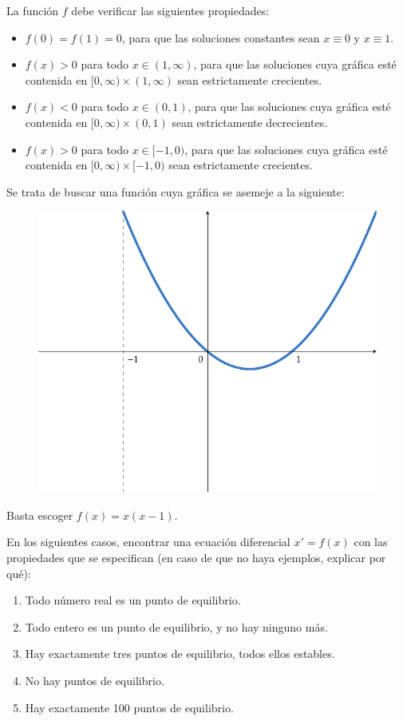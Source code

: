 \documentclass[11pt]{report}
\begin{document}
\begin{solution}
    La función $f$ debe verificar las siguientes propiedades:
    \begin{itemize}
        \item $f(0) = f(1) = 0$, para que las soluciones constantes sean $x \equiv 0$ y $x \equiv 1$.
        \item $f(x) > 0$ para todo $x \in(1,\infty)$, para que las soluciones cuya gráfica esté contenida en $[0,\infty)\times(1,\infty)$ sean estrictamente crecientes.
        \item $f(x) < 0$ para todo $x \in (0,1)$, para que las soluciones cuya gráfica esté  contenida en $[0,\infty)\times(0,1)$ sean estrictamente decrecientes.
        \item $f(x) > 0$ para todo $x \in [-1,0)$, para que las soluciones cuya gráfica esté contenida en $[0,\infty)\times[-1,0)$ sean estrictamente crecientes.
    \end{itemize}
    Se trata de buscar una función cuya gráfica se asemeje a la siguiente:
    \begin{figure}[H]
        \centering
        \includegraphics[scale = 0.7]{plot2/main.pdf}
    \end{figure}
    Basta escoger $f(x) = x(x-1)$.
\end{solution}

\begin{exercise}
    En los siguientes casos, encontrar una ecuación diferencial $x'=f(x)$ con las propiedades que se especifican (en caso de que no haya ejemplos, explicar por qué):
    \begin{enumerate}
        \item Todo número real es un punto de equilibrio.
        \item Todo entero es un punto de equilibrio, y no hay ninguno más.
        \item Hay exactamente tres puntos de equilibrio, todos ellos estables.
        \item No hay puntos de equilibrio.
        \item Hay exactamente 100 puntos de equilibrio.
    \end{enumerate}
\end{exercise}
\end{document}
